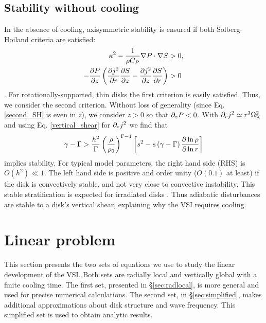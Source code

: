 \subsection{Stability without cooling}\label{solberg}
In the absence of cooling, axisymmetric stability is ensured
if both Solberg-Hoiland criteria  are satisfied:
\begin{subequations}\begin{align}
  \kappa^2 - \frac{1}{\rho C_P}\nabla P \cdot \nabla S &> 0,\\
  -\frac{\partial P}{\partial z}\left(\frac{\partial j^2}{\partial r}\frac{\partial S}{ \partial z} -
    \frac{\partial j^2}{\partial z}\frac{\partial S}{\partial r} \right)&>0 \label{second_SH} 
\end{align}\end{subequations}
\citep{tassoul78}. %
For rotationally-supported, thin disks %
the first criterion is easily satisfied. 
Thus, we consider the second
criterion. 
Without loss of generality (since Eq. \ref{second_SH} is even in $z$), we consider $z>0$
so that $\partial_zP<0$. With $\partial_r j^2\simeq r^3\Omega_{\rm K}^2$ and
using Eq. \ref{vertical_shear} for $\partial_zj^2$  we find that
\begin{align}\label{solberg2}
  \gamma - \Gamma > \frac{ h^2}{\Gamma}
  \left(\frac{\rho}{\rho_0}\right)^{\Gamma-1} \left[s^2
    -s\left(\gamma-\Gamma\right)\frac{\partial\ln{\rho}}{\partial\ln{r}} \right]
\end{align} 
implies stability. For typical model parameters, the right hand
side (RHS) is $O( h^2) \ll 1$.  The left hand side is positive and order unity ($O(0.1)$ at least) if the disk is convectively stable, and not very close to convective instability.  This stable stratification is expected for irradiated disks  \citep{chiang97}.
Thus adiabatic disturbances are stable to a disk's vertical shear, explaining why the VSI requires cooling. 

\section{Linear problem}\label{linear} 
This section presents the two sets of equations we use to study the
linear development of the VSI.  Both sets are radially local and vertically global 
with a finite cooling time.
The first set, presented in \S\ref{sec:radlocal}, is more general and used 
for precise numerical calculations.  The second set, in \S\ref{sec:simplified}, makes
additional approximations  about disk structure and wave frequency.  This simplified
set is used to obtain analytic results.


